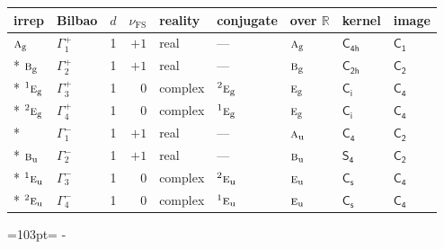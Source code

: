 \documentclass[10pt,a4paper]{article}
\newcommand{\needspace}[1]{\par\penalty-100\begingroup\dimen0=#1\relax\dimen2=\pagegoal
  \advance\dimen2-\pagetotal\ifdim\dimen0>\dimen2\relax\ifdim\dimen2>0pt\vfil\break\fi\fi
  \endgroup}
\numberwithin{equation}{section}
\newcommand{\grp}[1]{\mathsf{#1}}
\newcommand{\irr}[1]{\text{\normalfont\scshape #1}}
\newcommand{\conjpair}[1]{{}^{#1}}
\newcommand{\detbox}[1]{{\setlength{\fboxsep}{1pt}\fbox{#1}}}
\newcommand{\ptag}[1]{\mathrm{#1}}
\newcommand{\fsind}{\nu_{\mathrm{FS}}}
\begin{document}
{\small\renewcommand{\arraystretch}{1.25}\setlength{\tabcolsep}{4pt}\begin{longtable}{@{}llrrlllll@{}}\toprule
irrep & Bilbao & $d$ & $\fsind$ & reality & conjugate & over $\mathbb{R}$ & kernel & image\\\midrule\endhead
\bottomrule\endfoot\endlastfoot
$\irr{a}_{\ptag{g}}$ & $\Gamma_{1}^{+}$ & 1 & $+1$ & real & --- & $\irr{a}_{\ptag{g}}$ & \href{C4h.pdf}{$\grp{C_{4h}}$} & \href{C1.pdf}{$\grp{C_{1}}$}\\*
$\irr{b}_{\ptag{g}}$ & $\Gamma_{2}^{+}$ & 1 & $+1$ & real & --- & $\irr{b}_{\ptag{g}}$ & \href{C2h.pdf}{$\grp{C_{2h}}$} & \href{C2.pdf}{$\grp{C_{2}}$}\\*
$\conjpair{1}\irr{e}_{\ptag{g}}$ & $\Gamma_{3}^{+}$ & 1 & $0$ & complex & $\conjpair{2}\irr{e}_{\ptag{g}}$ & $\irr{e}_{\ptag{g}}$ & \href{S2.pdf}{$\grp{C_{i}}$} & \href{C4.pdf}{$\grp{C_{4}}$}\\*
$\conjpair{2}\irr{e}_{\ptag{g}}$ & $\Gamma_{4}^{+}$ & 1 & $0$ & complex & $\conjpair{1}\irr{e}_{\ptag{g}}$ & $\irr{e}_{\ptag{g}}$ & \href{S2.pdf}{$\grp{C_{i}}$} & \href{C4.pdf}{$\grp{C_{4}}$}\\*
\detbox{$\irr{a}_{\ptag{u}}$} & $\Gamma_{1}^{-}$ & 1 & $+1$ & real & --- & $\irr{a}_{\ptag{u}}$ & \href{C4.pdf}{$\grp{C_{4}}$} & \href{C2.pdf}{$\grp{C_{2}}$}\\*
$\irr{b}_{\ptag{u}}$ & $\Gamma_{2}^{-}$ & 1 & $+1$ & real & --- & $\irr{b}_{\ptag{u}}$ & \href{S4.pdf}{$\grp{S_{4}}$} & \href{C2.pdf}{$\grp{C_{2}}$}\\*
$\conjpair{1}\irr{e}_{\ptag{u}}$ & $\Gamma_{3}^{-}$ & 1 & $0$ & complex & $\conjpair{2}\irr{e}_{\ptag{u}}$ & $\irr{e}_{\ptag{u}}$ & \href{C1v.pdf}{$\grp{C_{s}}$} & \href{C4.pdf}{$\grp{C_{4}}$}\\*
$\conjpair{2}\irr{e}_{\ptag{u}}$ & $\Gamma_{4}^{-}$ & 1 & $0$ & complex & $\conjpair{1}\irr{e}_{\ptag{u}}$ & $\irr{e}_{\ptag{u}}$ & \href{C1v.pdf}{$\grp{C_{s}}$} & \href{C4.pdf}{$\grp{C_{4}}$}\\
\bottomrule\end{longtable}}
\needspace{103pt}
\end{document}
